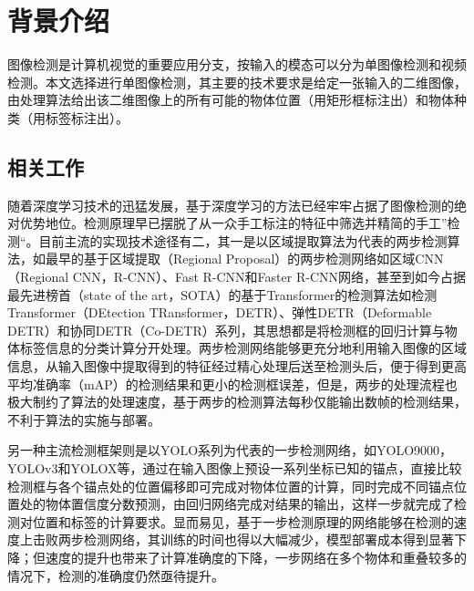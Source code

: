 \documentclass[11pt]{article}
\begin{document}
\newpage



\setcounter{page}{1}

\section{背景介绍}
图像检测是计算机视觉的重要应用分支，按输入的模态可以分为单图像检测和视频检测。本文选择进行单图像检测，其主要的技术要求是给定一张输入的二维图像，由处理算法给出该二维图像上的所有可能的物体位置（用矩形框标注出）和物体种类（用标签标注出）。
\subsection{相关工作}
随着深度学习技术的迅猛发展，基于深度学习的方法已经牢牢占据了图像检测的绝对优势地位。检测原理早已摆脱了从一众手工标注的特征中筛选并精简的手工”检测“\cite{wangRegionletsGenericObject2013}。目前主流的实现技术途径有二，其一是以区域提取算法为代表的两步检测算法，如最早的基于区域提取（Regional Proposal）的两步检测网络如区域CNN\cite{girshickRichFeatureHierarchies2014}（Regional CNN，R-CNN）、Fast R-CNN\cite{girshickFastRCNN}和Faster R-CNN网络\cite{renFasterRCNNRealTime2016}，甚至到如今占据最先进榜首（state of the art，SOTA）的基于Transformer的检测算法如检测Transformer\cite{carionEndtoEndObjectDetection2020}（DEtection TRansformer，DETR）、弹性DETR（Deformable DETR）和协同DETR（Co-DETR）系列，其思想都是将检测框的回归计算与物体标签信息的分类计算分开处理。两步检测网络能够更充分地利用输入图像的区域信息，从输入图像中提取得到的特征经过精心处理后送至检测头后，便于得到更高平均准确率（mAP）的检测结果和更小的检测框误差，但是，两步的处理流程也极大制约了算法的处理速度，基于两步的检测算法每秒仅能输出数帧的检测结果，不利于算法的实施与部署。

另一种主流检测框架则是以YOLO\cite{redmonYouOnlyLook2016}系列为代表的一步检测网络，如YOLO9000\cite{redmonYOLO9000BetterFaster2017}，YOLOv3\cite{redmonYOLOv3IncrementalImprovement2018}和YOLOX\cite{geYOLOXExceedingYOLO2021}等，通过在输入图像上预设一系列坐标已知的锚点，直接比较检测框与各个锚点处的位置偏移即可完成对物体位置的计算，同时完成不同锚点位置处的物体置信度分数预测，由回归网络完成对结果的输出，这样一步就完成了检测对位置和标签的计算要求。显而易见，基于一步检测原理的网络能够在检测的速度上击败两步检测网络，其训练的时间也得以大幅减少，模型部署成本得到显著下降；但速度的提升也带来了计算准确度的下降，一步网络在多个物体和重叠较多的情况下，检测的准确度仍然亟待提升。
\end{document}
